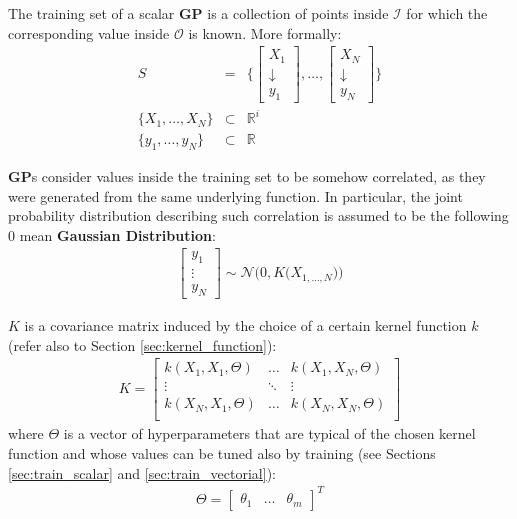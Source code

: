 \documentclass{article}
\begin{document}
The training set of a scalar \textbf{GP} is a collection of points inside $\mathcal{I}$ for which the corresponding value inside $\mathcal{O}$ is known. More formally:
\begin{eqnarray}
S &=& 
\bigg \lbrace 
\begin{bmatrix} X_1 \\ \downarrow \\ y_1 \end{bmatrix}, 
\hdots,  
\begin{bmatrix} X_N \\ \downarrow \\ y_N \end{bmatrix}
\bigg \rbrace \\
\big \lbrace X_1, \hdots, X_N \big \rbrace &\subset & \mathbb{R}^i \\
\big \lbrace y_1, \hdots, y_N \big \rbrace &\subset & \mathbb{R}
\end{eqnarray}

\textbf{GP}s consider values inside the training set to be somehow correlated, as they were generated from the same underlying function.
In particular, the joint probability distribution describing such correlation is assumed to be the following 0 mean \textbf{Gaussian Distribution}:
\begin{eqnarray}
\begin{bmatrix} y_1 \\ \vdots \\ y_N \end{bmatrix} \sim \mathcal{N} 
\bigg (
0, K \big( X_{1, \hdots, N} \big)
\bigg )  
\label{eq:y_joint_distr}
\end{eqnarray}

$K$ is a covariance matrix induced by the choice of a certain kernel function $k$ (refer also to Section \ref{sec:kernel_function}):
\begin{eqnarray}
K = \begin{bmatrix}
k(X_1, X_1, \Theta) & \hdots & k(X_1, X_N, \Theta) \\ 
\vdots & \ddots & \vdots \\ 
k(X_N, X_1, \Theta) & \hdots & k(X_N, X_N, \Theta) \\ 
\end{bmatrix}
\end{eqnarray}
where $\Theta$ is a vector of hyperparameters that are typical of the chosen kernel function and whose values can be tuned also by training (see Sections \ref{sec:train_scalar} and \ref{sec:train_vectorial}):
\begin{eqnarray}
\Theta = \begin{bmatrix} \theta_1 & \hdots & \theta_m \end{bmatrix} ^ T
\end{eqnarray}
\end{document}
